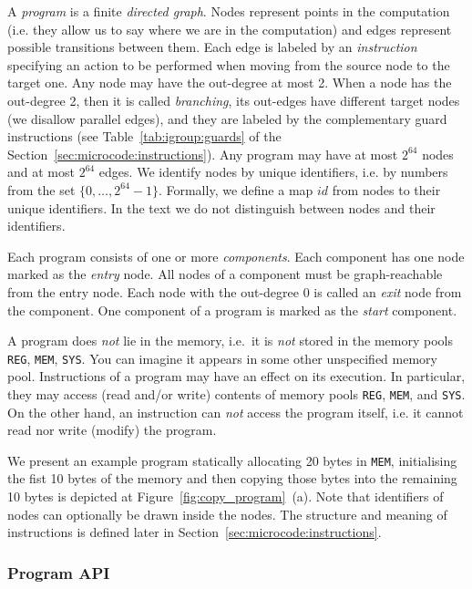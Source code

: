 \documentclass[10pt,twocolumn]{article}
\begin{document}
A \emph{program} is a finite \emph{directed graph}. Nodes represent points in
the computation (i.e. they allow us to say where we are in the computation) and
edges represent possible transitions between them. Each edge is labeled by an
\emph{instruction} specifying an action to be performed when moving from the
source node to the target one. Any node may have the out-degree at most 2. When
a node has the out-degree 2, then it is called \emph{branching}, its out-edges
have different target nodes (we disallow parallel edges), and they are labeled
by the complementary guard instructions (see Table~\ref{tab:igroup:guards} of
the Section~\ref{sec:microcode:instructions}). Any program may have at most $
2^{64} $ nodes and at most $ 2^{64} $ edges. We identify nodes by unique
identifiers, i.e. by numbers from the set $ \{ 0, \ldots, 2^{64}-1 \} $.
Formally, we define a map $ \mathit{id} $ from nodes to their unique
identifiers. In the text we do not distinguish between nodes and their
identifiers.

Each program consists of one or more \emph{components}. Each component has one
node marked as the \emph{entry} node. All nodes of a component must be
graph-reachable from the entry node. Each node with the out-degree 0 is called
an \emph{exit} node from the component. One component of a program is marked as
the \emph{start} component.

A program does \emph{not} lie in the memory, i.e.~it is \emph{not} stored in the
memory pools \texttt{REG}, \texttt{MEM}, \texttt{SYS}. You can imagine it
appears in some other unspecified memory pool. Instructions of a program may
have an effect on its execution. In particular, they may access (read and/or
write) contents of memory pools \texttt{REG}, \texttt{MEM}, and \texttt{SYS}. On
the other hand, an instruction can \emph{not} access the program itself, i.e. it
cannot read nor write (modify) the program.

We present an example program statically allocating 20 bytes in \texttt{MEM},
initialising the fist 10 bytes of the memory and then copying those bytes into
the remaining 10 bytes is depicted at Figure~\ref{fig:copy_program}~(a). Note
that identifiers of nodes can optionally be drawn inside the nodes. The
structure and meaning of instructions is defined later in
Section~\ref{sec:microcode:instructions}.


\subsubsection{Program API}
\label{sec:microcode:programAPI}
\end{document}
